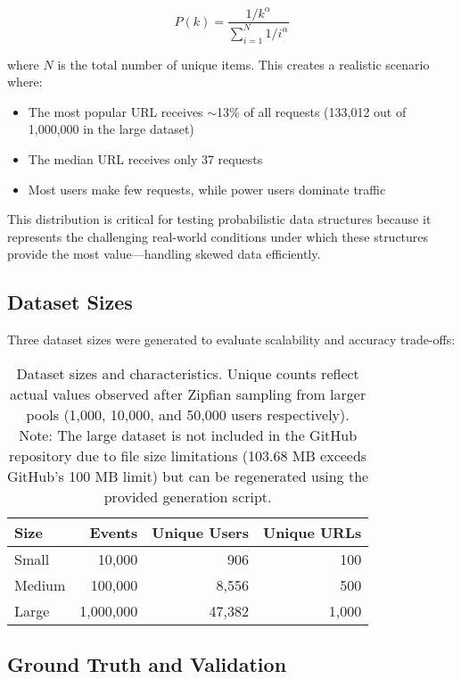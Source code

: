 \begin{equation}
    P(k) = \frac{1/k^{\alpha}}{\sum_{i=1}^{N} 1/i^{\alpha}}
\end{equation}

where $N$ is the total number of unique items. This creates a realistic scenario where:

\begin{itemize}
    \item The most popular URL receives $\sim$13\% of all requests (133,012 out of 1,000,000 in the large dataset)
    \item The median URL receives only 37 requests
    \item Most users make few requests, while power users dominate traffic
\end{itemize}

This distribution is critical for testing probabilistic data structures because it represents the challenging real-world conditions under which these structures provide the most value---handling skewed data efficiently.

\subsection{Dataset Sizes}

Three dataset sizes were generated to evaluate scalability and accuracy trade-offs:

\begin{table}[h]
\centering
\begin{tabular}{@{}lrrr@{}}
\toprule
\textbf{Size} & \textbf{Events} & \textbf{Unique Users} & \textbf{Unique URLs} \\
\midrule
Small  & 10,000     & 906       & 100  \\
Medium & 100,000    & 8,556     & 500  \\
Large  & 1,000,000  & 47,382    & 1,000 \\
\bottomrule
\end{tabular}
\caption{Dataset sizes and characteristics. Unique counts reflect actual values observed after Zipfian sampling from larger pools (1,000, 10,000, and 50,000 users respectively). Note: The large dataset is not included in the GitHub repository due to file size limitations (103.68 MB exceeds GitHub's 100 MB limit) but can be regenerated using the provided generation script.}
\label{tab:dataset_sizes}
\end{table}

\subsection{Ground Truth and Validation}

